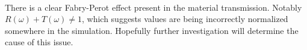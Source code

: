 \documentclass[11pt]{article}
\begin{document}
    \begin{center}
    \end{center}
    { \hspace*{\fill} \\}
    
    There is a clear Fabry-Perot effect present in the material
transmission. Notably \(R(\omega)+T(\omega)\neq1\), which suggests
values are being incorrectly normalized somewhere in the simulation.
Hopefully further investigation will determine the cause of this issue.


    
    
    
    
\end{document}
